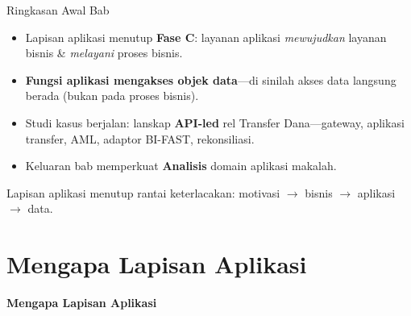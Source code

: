 \documentclass[aspectratio=169, table]{beamer}
\newcommand{\sectionframe}[1]{%
  \begin{frame}{\hfill}
    \centering
    \Huge{\textbf{#1}}
  \end{frame}
}
\newcommand{\takeaway}[1]{%
  \vspace{4pt}
  {\footnotesize #1}
}
\begin{document}
\begin{frame}{Ringkasan Awal Bab}
  \vspace{6pt}
  \begin{itemize}
    \item Lapisan aplikasi menutup \textbf{Fase C}: layanan aplikasi
          \emph{mewujudkan} layanan bisnis \& \emph{melayani} proses bisnis.
    \item \textbf{Fungsi aplikasi mengakses objek data}---di sinilah akses data
          langsung berada (bukan pada proses bisnis).
    \item Studi kasus berjalan: lanskap \textbf{API-led} rel Transfer
          Dana---gateway, aplikasi transfer, AML, adaptor BI-FAST, rekonsiliasi.
    \item Keluaran bab memperkuat \textbf{Analisis} domain aplikasi makalah.
  \end{itemize}
  \takeaway{Lapisan aplikasi menutup rantai keterlacakan: motivasi $\rightarrow$
  bisnis $\rightarrow$ aplikasi $\rightarrow$ data.}
\end{frame}

\section{Mengapa Lapisan Aplikasi}
\sectionframe{Mengapa Lapisan Aplikasi}
\end{document}

